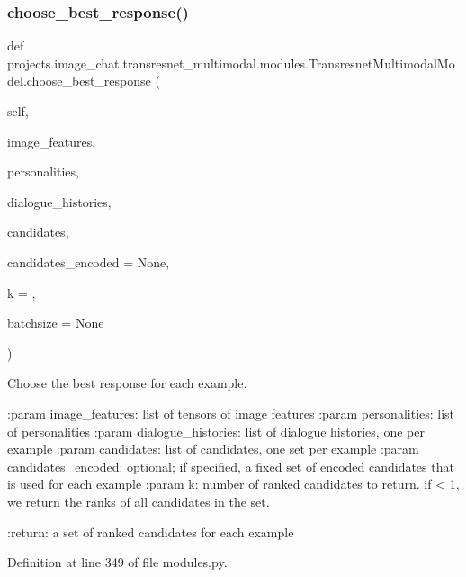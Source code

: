 \subsubsection{\texorpdfstring{choose\+\_\+best\+\_\+response()}{choose\_best\_response()}}
{\footnotesize\ttfamily def projects.\+image\+\_\+chat.\+transresnet\+\_\+multimodal.\+modules.\+Transresnet\+Multimodal\+Model.\+choose\+\_\+best\+\_\+response (\begin{DoxyParamCaption}\item[{}]{self,  }\item[{}]{image\+\_\+features,  }\item[{}]{personalities,  }\item[{}]{dialogue\+\_\+histories,  }\item[{}]{candidates,  }\item[{}]{candidates\+\_\+encoded = {\ttfamily None},  }\item[{}]{k = {},  }\item[{}]{batchsize = {\ttfamily None} }\end{DoxyParamCaption})}

\begin{DoxyVerb}Choose the best response for each example.

:param image_features:
    list of tensors of image features
:param personalities:
    list of personalities
:param dialogue_histories:
    list of dialogue histories, one per example
:param candidates:
    list of candidates, one set per example
:param candidates_encoded:
    optional; if specified, a fixed set of encoded candidates that is
    used for each example
:param k:
    number of ranked candidates to return. if < 1, we return the ranks
    of all candidates in the set.

:return:
    a set of ranked candidates for each example
\end{DoxyVerb}
 

Definition at line 349 of file modules.\+py.


